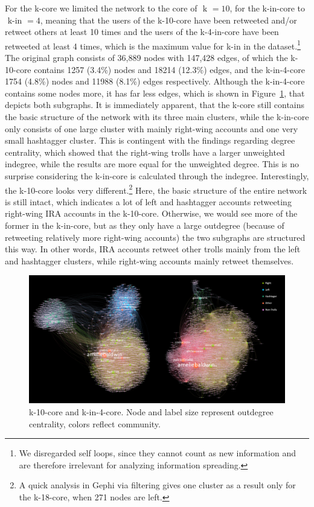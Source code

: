 \documentclass[12pt, titlepage=true, toc=bib]{scrartcl}
\begin{document}
For the k-core we limited the network to the core of \( \text{ k } = 10 \), for the k-in-core to \( \text{ k-in } = 4 \), meaning that the users of the k-10-core have been retweeted and/or retweet others at least 10 times and the users of the k-4-in-core have been retweeted at least 4 times, which is the maximum value for k-in in the dataset.\footnote{We disregarded self loops, since they cannot count as new information and are therefore irrelevant for analyzing information spreading.} The original graph consists of 36,889 nodes with 147,428 edges, of which the k-10-core contains 1257 (3.4\%) nodes and 18214 (12.3\%) edges, and the k-in-4-core 1754 (4.8\%) nodes and 11988 (8.1\%) edges respectively. Although the k-in-4-core contains some nodes more, it has far less edges, which is shown in Figure~\ref{fig:kcore}, that depicts both subgraphs. It is immediately apparent, that the k-core still contains the basic structure of the network with its three main clusters, while the k-in-core only consists of one large cluster with mainly right-wing accounts and one very small hashtagger cluster. This is contingent with the findings regarding degree centrality, which showed that the right-wing trolls have a larger unweighted indegree, while the results are more equal for the unweighted degree. This is no surprise considering the k-in-core is calculated through the indegree. Interestingly, the k-10-core looks very different.\footnote{A quick analysis in Gephi via filtering gives one cluster as a result only for the k-18-core, when 271 nodes are left.} Here, the basic structure of the entire network is still intact, which indicates a lot of left and hashtagger accounts retweeting right-wing IRA accounts in the k-10-core. Otherwise, we would see more of the former in the k-in-core, but as they only have a large outdegree (because of retweeting relatively more right-wing accounts) the two subgraphs are structured this way. In other words, IRA accounts retweet other trolls mainly from the left and hashtagger clusters, while right-wing accounts mainly retweet themselves.

\begin{figure}[!ht]
\centering
\includegraphics[width=0.95\linewidth]{final_k_graphs.png}
\caption[k-core and k-in-core]{k-10-core and k-in-4-core. Node and label size represent outdegree centrality, colors reflect community.}
\label{fig:kcore}
\end{figure}
\end{document}
